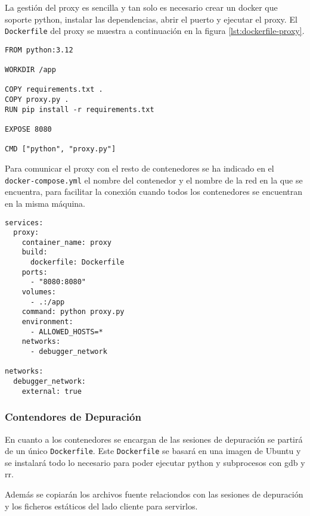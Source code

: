 La gestión del proxy es sencilla y tan solo es necesario crear un docker que soporte python, instalar las dependencias, abrir el puerto y ejecutar el proxy. El \texttt{Dockerfile} del proxy se muestra a continuación en la figura \ref{lst:dockerfile-proxy}. 

\begin{lstlisting}[caption={Dockerfile para el proxy}, label={lst:dockerfile-proxy}]
FROM python:3.12

WORKDIR /app

COPY requirements.txt .
COPY proxy.py .
RUN pip install -r requirements.txt

EXPOSE 8080

CMD ["python", "proxy.py"]
\end{lstlisting}

Para comunicar el proxy con el resto de contenedores se ha indicado en el \texttt{docker-compose.yml} el nombre del contenedor y el nombre de la red en la que se encuentra, para facilitar la conexión cuando todos los contenedores se encuentran en la misma máquina.

\begin{lstlisting}[caption={Docker-compose.yml para el contenedor del proxy}, label={lst:docker-compose-proxy}]
    services:
  proxy:
    container_name: proxy  
    build:
      dockerfile: Dockerfile
    ports:
      - "8080:8080" 
    volumes:
      - .:/app
    command: python proxy.py
    environment:
      - ALLOWED_HOSTS=*
    networks:
      - debugger_network

networks:
  debugger_network:
    external: true 
\end{lstlisting}

\subsubsection{Contendores de Depuración}

En cuanto a los contenedores se encargan de las sesiones de depuración se partirá de un único \texttt{Dockerfile}. Este \texttt{Dockerfile} se basará en una imagen de Ubuntu y se instalará todo lo necesario para poder ejecutar python y subprocesos con gdb y rr.

Además se copiarán los archivos fuente relaciondos con las sesiones de depuración y los ficheros estáticos del lado cliente para servirlos.


